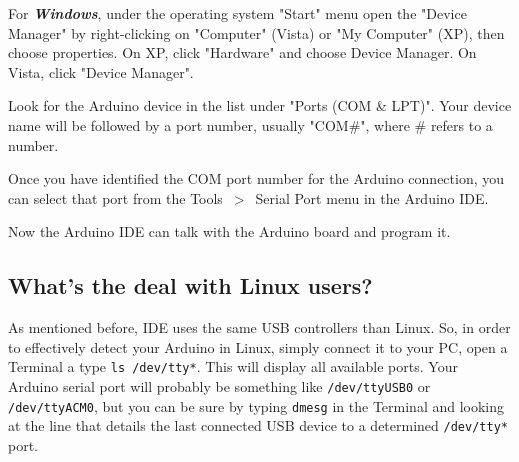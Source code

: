 For \emph{\bf{Windows}}, under the operating system "Start" menu open the "Device Manager" by right-clicking on "Computer" (Vista) or "My Computer" (XP), then choose properties. On XP, click "Hardware" and choose Device Manager. On Vista, click "Device Manager".

Look for the Arduino device in the list under "Ports (COM \& LPT)". Your device name will be followed by a port number, usually "COM\#", where \# refers to a number.

Once you have identified the COM port number for the Arduino connection, you can select that port from the Tools~$>$~Serial Port menu in the Arduino IDE.

Now the Arduino IDE can talk with the Arduino board and program it.

\subsection{What's the deal with Linux users?}
As mentioned before, IDE uses the same USB controllers than Linux. So, in order to effectively detect your Arduino in Linux, simply connect it to your PC, open a Terminal a type \texttt{ls /dev/tty*}. This will display all available ports. Your Arduino serial port will probably be something like \texttt{/dev/ttyUSB0} or \texttt{/dev/ttyACM0}, but you can be sure by typing \texttt{dmesg} in the Terminal and looking at the line that details the last connected USB device to a determined \texttt{/dev/tty*} port.
